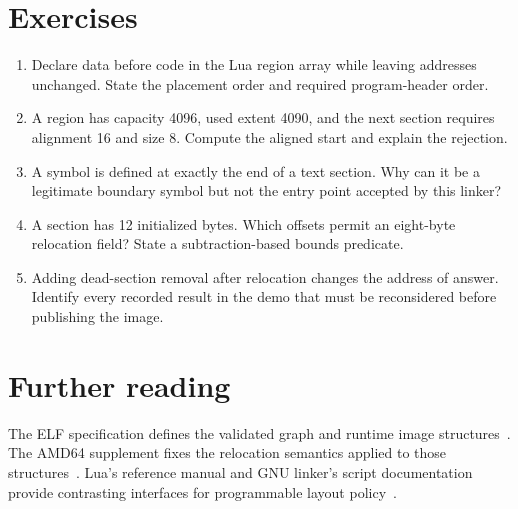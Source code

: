\section{Exercises}
\label{sec:ch60-exercises}
\begin{enumerate}
\item\label{ex:ch60-order} Declare data before code in the Lua region array while leaving addresses unchanged. State the placement order and required program-header order.
\item\label{ex:ch60-size} A region has capacity 4096, used extent 4090, and the next section requires alignment 16 and size 8. Compute the aligned start and explain the rejection.
\item\label{ex:ch60-entry} A symbol is defined at exactly the end of a text section. Why can it be a legitimate boundary symbol but not the entry point accepted by this linker?
\item\label{ex:ch60-reloc-bounds} A section has 12 initialized bytes. Which offsets permit an eight-byte relocation field? State a subtraction-based bounds predicate.
\item\label{ex:ch60-phase} Adding dead-section removal after relocation changes the address of answer. Identify every recorded result in the demo that must be reconsidered before publishing the image.
\end{enumerate}

\section{Further reading}
\label{sec:ch60-reading}
The ELF specification defines the validated graph and runtime image structures~\cite{xinuos-2026-elf}.
The AMD64 supplement fixes the relocation semantics applied to those structures~\cite{matz-2012-amd64}.
Lua's reference manual and GNU linker's script documentation provide contrasting interfaces for programmable layout policy~\cite{ierusalimschy-2026-lua,gnu-2026-ld}.

